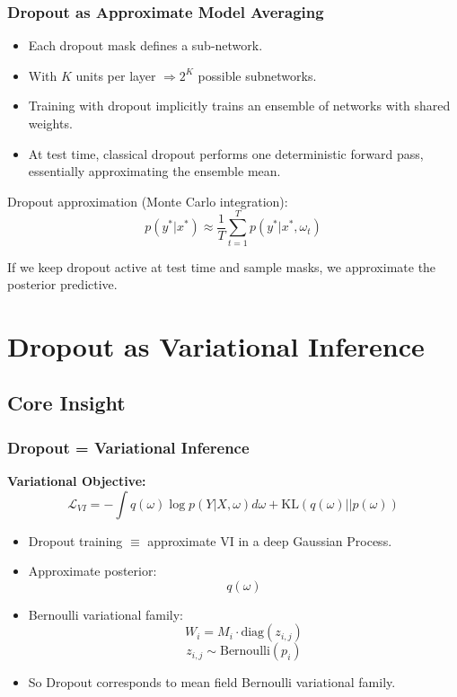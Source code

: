 \documentclass[
	11pt, %
]{beamer}
\begin{document}
\begin{frame}
	\frametitle{Dropout as Approximate Model Averaging}

	\begin{itemize}
		\item Each dropout mask defines a \alert{sub-network}.
		\item With $K$ units per layer $\Rightarrow 2^K$ possible subnetworks.
		\item Training with dropout implicitly trains an ensemble of networks
		with shared weights.
		\item At test time, classical dropout performs one deterministic forward pass, essentially approximating the ensemble mean.
	\end{itemize}

	\bigskip
	
	Dropout approximation (\alert{Monte Carlo integration}):
	\[
	p(y^*|x^*) \approx
	\frac{1}{T}\sum_{t=1}^T
	p(y^*|x^*,\omega_t)
	\]

	If we keep dropout active at test time and sample masks, we approximate the posterior predictive.


\end{frame}


\section{Dropout as Variational Inference}

\subsection{Core Insight}

\begin{frame}
	\frametitle{Dropout = Variational Inference}

	\textbf{Variational Objective:}
	\[
	\mathcal{L}_{VI}
	=
	-\int q(\omega)\log p(Y|X,\omega)d\omega
	+
	\text{KL}(q(\omega)||p(\omega))
	\]

	\bigskip

	\begin{itemize}
		\item Dropout training $\equiv$ approximate VI in a deep Gaussian Process.
		\item Approximate posterior:
		\[
		q(\omega)
		\]
		\item \alert{Bernoulli} variational family:
		\[
		W_i = M_i \cdot \text{diag}(z_{i,j})
		\]
		\[
		z_{i,j} \sim \text{Bernoulli}(p_i)
		\]
		\item So Dropout corresponds to \alert{mean field} Bernoulli variational family.
	\end{itemize}

\end{frame}
\end{document}
